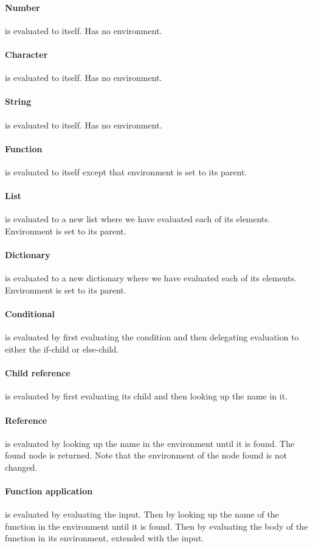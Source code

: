 \documentclass[a4paper,12pt]{article}
\begin{document}
\paragraph{Number} is evaluated to itself. Has no environment.
\paragraph{Character} is evaluated to itself. Has no environment.
\paragraph{String} is evaluated to itself. Has no environment.
\paragraph{Function} is evaluated to itself except that environment is set to its parent.
\paragraph{List} is evaluated to a new list where we have evaluated each of its elements. Environment is set to its parent.
\paragraph{Dictionary} is evaluated to a new dictionary where we have evaluated each of its elements. Environment is set to its parent.
\paragraph{Conditional} is evaluated by first evaluating the condition and then delegating evaluation to either the if-child or else-child.
\paragraph{Child reference} is evaluated by first evaluating its child and then looking up the name in it.
\paragraph{Reference} is evaluated by looking up the name in the environment until it is found. The found node is returned. Note that the environment of the node found is not changed.
\paragraph{Function application} is evaluated by evaluating the input. Then by looking up the name of the function in the environment until it is found. Then by evaluating the body of the function in its environment, extended with the input.
\end{document}
